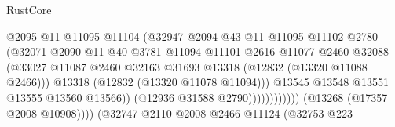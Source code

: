 \begin{lexlean}{RustCore}
\begin{coremodule}
                                                  @2095
                                                  @11
                                                  @11095
                                                  @11104
                                                  (@32947
                                                    @2094
                                                    @43
                                                    @11
                                                    @11095
                                                    @11102
                                                    @2780
                                                    (@32071
                                                      @2090
                                                      @11
                                                      @40
                                                      @3781
                                                      @11094
                                                      @11101
                                                      @2616
                                                      @11077
                                                      @2460
                                                      @32088
                                                      (@33027
                                                        @11087
                                                        @2460
                                                        @32163
                                                        @31693
                                                        @13318
                                                        (@12832 (@13320 @11088 @2466)))
                                                      @13318
                                                      (@12832 (@13320 @11078 @11094)))
                                                    @13545
                                                    @13548
                                                    @13551
                                                    @13555
                                                    @13560
                                                    @13566))
                                                (@12936 @31588 @2790))))))))))))
                          (@13268 (@17357 @2008 @10908))))
                      (@32747
                        @2110
                        @2008
                        @2466
                        @11124
                        (@32753
                          @223

\end{coremodule}
\end{lexlean}
